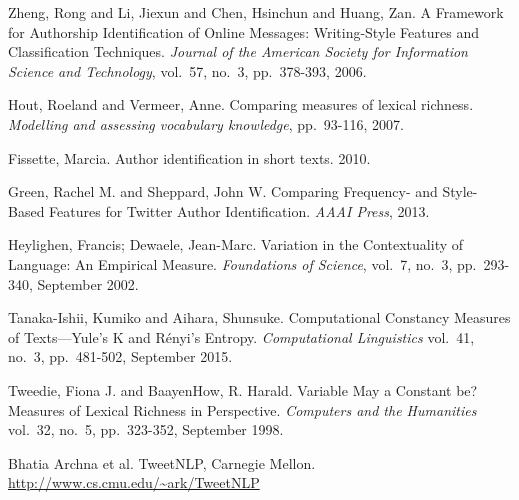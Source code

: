 \documentclass[journal, a4paper, 12pt]{IEEEtran}
\begin{document}
\begin{thebibliography}{2}

	Zheng, Rong and Li, Jiexun and Chen, Hsinchun and Huang, Zan. A Framework for Authorship Identification
	of Online Messages: Writing-Style Features and Classification Techniques. {\em Journal of the American
	Society for Information Science and Technology},
	vol.~57, no.~3, pp.~378-393, 2006.

	Hout, Roeland and Vermeer, Anne. Comparing measures of lexical richness. {\em Modelling and assessing vocabulary 
	knowledge}, pp.~93-116, 2007.

	Fissette, Marcia. Author identification in short texts. 2010.

	Green, Rachel M. and Sheppard, John W. Comparing Frequency- and Style-Based Features for Twitter
	Author Identification. {\em AAAI Press}, 2013.
	
	Heylighen, Francis; Dewaele, Jean-Marc. Variation in the Contextuality of Language: An Empirical Measure.
	{\em Foundations of Science}, vol.~7, no.~3, pp.~293-340, September 2002.

	Tanaka-Ishii, Kumiko and Aihara, Shunsuke. Computational Constancy Measures of Texts—Yule's K and Rényi's Entropy.
	{\em Computational Linguistics} vol.~41, no.~3, pp.~481-502, September 2015.

	Tweedie, Fiona J. and BaayenHow, R. Harald. Variable May a Constant be? Measures of Lexical Richness in Perspective.
	{\em Computers and the Humanities} vol.~32, no.~5, pp.~323-352, September 1998.	

	Bhatia Archna et al. TweetNLP, Carnegie Mellon. \url{http://www.cs.cmu.edu/~ark/TweetNLP}

\end{thebibliography}
\end{document}
